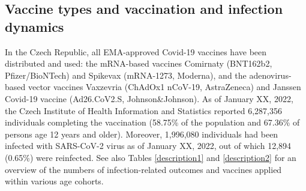 \documentclass[preprint,12pt,authoryear]{elsarticle}
\begin{document}
\subsection{Vaccine types and vaccination and infection dynamics}

In the Czech Republic, all EMA-approved Covid-19 vaccines have been distributed and used: the mRNA-based vaccines Comirnaty (BNT162b2, Pfizer/BioNTech) and Spikevax (mRNA-1273, Moderna), and the adenovirus-based vector vaccines Vaxzevria (ChAdOx1 nCoV-19, AstraZeneca) and Janssen Covid-19 vaccine (Ad26.CoV2.S, Johnson\&Johnson). 
As of January XX, 2022, the Czech Institute of Health Information and Statistics reported 6,287,356 individuals completing the vaccination (58.75\% of the population and 67.36\% of persons age 12 years and older).%
Moreover,  1,996,080 individuals had been infected with SARS-CoV-2 virus as of January XX, 2022, out of which 12,894 (0.65\%) were reinfected.%
See also Tables \ref{description1} and \ref{description2} for an overview of the numbers of infection-related outcomes and vaccines applied within various age cohorts.


\end{document}
